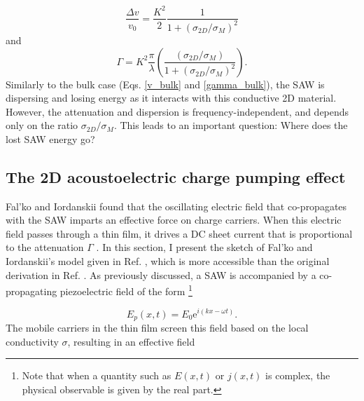 \documentclass[double,12pt,1in]{beavtex}
\begin{document}
\begin{equation}
    \frac{\Delta v}{v_0} = \frac{K^2}{2}\frac{1}{1+(\sigma_{2D}/\sigma_M)^2} \label{v_2D}
\end{equation}
and
\begin{equation}
    \Gamma = K^2 \frac{\pi}{\lambda}\left(\frac{(\sigma_{2D}/\sigma_M)}{1+(\sigma_{2D}/\sigma_M)^2}\right). \label{gamma_2D}
\end{equation}
Similarly to the bulk case (Eqs. \ref{v_bulk} and \ref{gamma_bulk}), the SAW is dispersing and losing energy as it interacts with this conductive 2D material. However, the attenuation and dispersion is frequency-independent, and depends only on the ratio $\sigma_{2D}/\sigma_M$. This leads to an important question: Where does the lost SAW energy go? 


\subsection{The 2D acoustoelectric charge pumping effect}


Fal'ko and Iordanskii found that the oscillating electric field that co-propagates with the SAW imparts an effective force on charge carriers. When this electric field passes through a thin film, it drives a DC sheet current that is proportional to the attenuation $\Gamma$ \cite{falko_acoustoelectric_1993}. In this section, I present the sketch of Fal'ko and Iordanskii's model given in Ref. \cite{esslinger_ultrasonic_1994}, which is more accessible than the original derivation in Ref. \cite{falko_acoustoelectric_1993}. As previously discussed, a SAW is accompanied by a co-propagating piezoelectric field of the form \footnote{Note that when a quantity such as $E(x,t)$ or $j(x,t)$ is complex, the physical observable is given by the real part.}

\begin{equation}
    E_p(x, t) = E_0 \mathrm{e}^{i(kx - \omega t)}. \label{SAW plane wave}
\end{equation}
The mobile carriers in the thin film screen this field based on the local conductivity $\sigma$, resulting in an effective field
\end{document}
